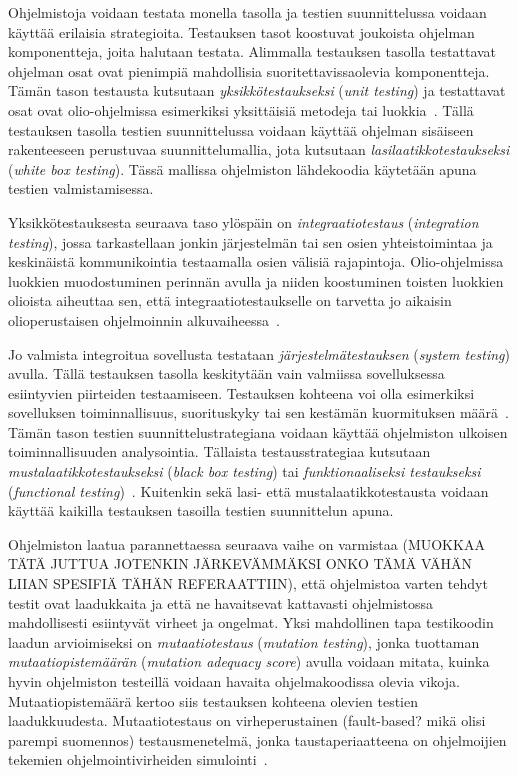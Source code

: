 \documentclass[finnish]{tktltiki2}
\theoremstyle{definition}
\theoremstyle{remark}
\begin{document}
Ohjelmistoja voidaan testata monella tasolla ja testien suunnittelussa voidaan käyttää erilaisia strategioita. Testauksen tasot koostuvat joukoista ohjelman komponentteja, joita halutaan testata. Alimmalla testauksen tasolla testattavat ohjelman osat ovat pienimpiä mahdollisia suoritettavissaolevia komponentteja. Tämän tason testausta kutsutaan \textit{yksikkötestaukseksi} (\textit{unit testing}) ja testattavat osat ovat olio-ohjelmissa esimerkiksi yksittäisiä metodeja tai luokkia~\cite[s. 45]{Binder:1999}. Tällä testauksen tasolla testien suunnittelussa voidaan käyttää ohjelman sisäiseen rakenteeseen perustuvaa suunnittelumallia, jota kutsutaan \textit{lasilaatikkotestaukseksi} (\textit{white box testing}). Tässä mallissa ohjelmiston lähdekoodia käytetään apuna testien valmistamisessa.~\cite[s. 52]{Binder:1999}

Yksikkötestauksesta seuraava taso ylöspäin on \textit{integraatiotestaus} (\textit{integration testing}), jossa tarkastellaan jonkin järjestelmän tai sen osien yhteistoimintaa ja keskinäistä kommunikointia testaamalla osien välisiä rajapintoja. Olio-ohjelmissa luokkien muodostuminen perinnän avulla ja niiden koostuminen toisten luokkien olioista aiheuttaa sen, että integraatiotestaukselle on tarvetta jo aikaisin olioperustaisen ohjelmoinnin alkuvaiheessa~\cite[s. 45]{Binder:1999}.

Jo valmista integroitua sovellusta testataan \textit{järjestelmätestauksen} (\textit{system testing}) avulla. Tällä testauksen tasolla keskitytään vain valmiissa sovelluksessa esiintyvien piirteiden testaamiseen. Testauksen kohteena voi olla esimerkiksi sovelluksen toiminnallisuus, suorituskyky tai sen kestämän kuormituksen määrä~\cite[s. 45]{Binder:1999}. Tämän tason testien suunnittelustrategiana voidaan käyttää ohjelmiston ulkoisen toiminnallisuuden analysointia. Tällaista testausstrategiaa kutsutaan \textit{mustalaatikkotestaukseksi} (\textit{black box testing}) tai \textit{funktionaaliseksi testaukseksi} (\textit{functional testing})~\cite[s. 52]{Binder:1999}. Kuitenkin sekä lasi- että mustalaatikkotestausta voidaan käyttää kaikilla testauksen tasoilla testien suunnittelun apuna. 



Ohjelmiston laatua parannettaessa seuraava vaihe on varmistaa (MUOKKAA TÄTÄ JUTTUA JOTENKIN JÄRKEVÄMMÄKSI ONKO TÄMÄ VÄHÄN LIIAN SPESIFIÄ TÄHÄN REFERAATTIIN), että ohjelmistoa varten tehdyt testit ovat laadukkaita ja että ne havaitsevat kattavasti ohjelmistossa mahdollisesti esiintyvät virheet ja ongelmat. Yksi mahdollinen tapa testikoodin laadun arvioimiseksi on \textit{mutaatiotestaus} (\textit{mutation testing}), jonka tuottaman \textit{mutaatiopistemäärän} (\textit{mutation adequacy score}) avulla voidaan mitata, kuinka hyvin ohjelmiston testeillä voidaan havaita ohjelmakoodissa olevia vikoja. Mutaatiopistemäärä kertoo siis testauksen kohteena olevien testien laadukkuudesta. Mutaatiotestaus on virheperustainen (fault-based? mikä olisi parempi suomennos) testausmenetelmä, jonka taustaperiaatteena on ohjelmoijien tekemien ohjelmointivirheiden simulointi~\cite{Jia:Harman:2011}.
\end{document}
